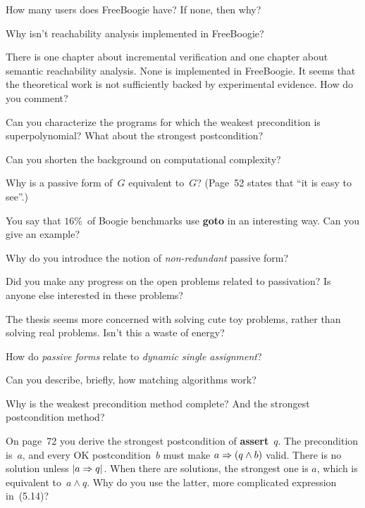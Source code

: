 
\Q How many users does FreeBoogie have? If none, then why?

\Q Why isn't reachability analysis implemented in FreeBoogie?

\Q There is one chapter about incremental verification and one chapter
about semantic reachability analysis. None is implemented in FreeBoogie. It
seems that the theoretical work is not sufficiently backed by experimental
evidence.  How do you comment?

\Q Can you characterize the programs for which the weakest precondition is
superpolynomial? What about the strongest postcondition?

\Q Can you shorten the background on computational complexity?


\Q Why is a passive form of~$G$ equivalent to~$G$? (Page~52 states that ``it
is easy to see''.)

\Q You say that $16\%$~of Boogie benchmarks use {\bf goto} in an
interesting way. Can you give an example?

\Q Why do you introduce the notion of {\it non-redundant\/} passive
form?


\Q Did you make any progress on the open problems related to passivation?
Is anyone else interested in these problems?

\Q The thesis seems more concerned with solving cute toy problems, rather
than solving real problems. Isn't this a waste of energy?

\Q How do {\it passive forms\/} relate to {\it dynamic single assignment\/}?

\Q Can you describe, briefly, how matching algorithms work?

\Q Why is the weakest precondition method complete? And the strongest
postcondition method?

\Q On page~72 you derive the strongest postcondition of {\bf assert}~$q$.
The precondition is~$a$, and every OK postcondition~$b$ must make $a\Rightarrow
(q\land b)$ valid. There is no solution unless $|a\Rightarrow q|$.  When there
are solutions, the strongest one is $a$, which is equivalent to~$a\land q$.
Why do you use the latter, more complicated expression in~(5.14)?


